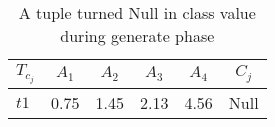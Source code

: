 \begin{table}[!htbp]
\caption{A tuple turned Null in class value during generate phase}
\label{table:table2_5}
\centering
\begin{tabular}{lccccc}
	\toprule
	\textbf{$\mathit{T_{c_j}}$} & \textbf{$\mathit{A_1}$} & \textbf{$\mathit{A_2}$} & \textbf{$\mathit{A_3}$} & \textbf{$\mathit{A_4}$} & \textbf{$\mathit{C_j}$} \\
	\midrule
	$\mathit{t1}$ & 0.75 & 1.45 & 2.13 & 4.56 & Null \\
	\bottomrule
\end{tabular} 
\end{table}
